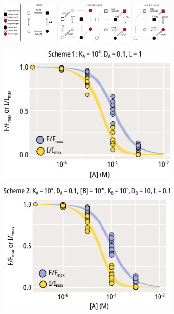 \begin{figure}[hbtp]
	\centering
	\begin{subfigure}[t]{0.9\textwidth}
		\caption{}\label{ch4fig:mwc_model_diagrams}
		\centering
		\includegraphics[width=\textwidth]{mwc_model_diagrams.pdf}
	\end{subfigure}
	\vfill
	\begin{subfigure}[t]{0.3\textwidth}
		\caption{}\label{ch4fig:mwc_scheme_1_fits}
		\centering
		\includegraphics[width=\textwidth]{mwc_scheme_1_fits.pdf}
	\end{subfigure}
	\hfill
	\begin{subfigure}[t]{0.3\textwidth}
		\caption{}\label{ch4fig:mwc_scheme_2_fits}
		\centering
		\includegraphics[width=\textwidth]{mwc_scheme_2_fits.pdf}

\end{subfigure}
\end{figure}
